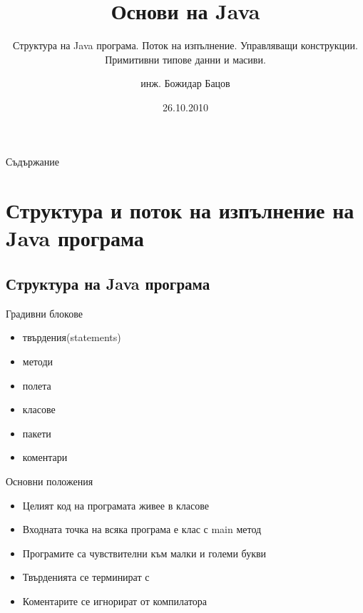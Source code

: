 \documentclass{beamer}
\title{Основи на Java}
\subtitle
{Структура на Java програма. Поток на изпълнение. Управляващи
  конструкции. Примитивни типове данни и масиви.}
\author{инж. Божидар Бацов}
\institute{Drow Ltd.}
\date{26.10.2010}
\begin{document}

\begin{frame}
  \titlepage
\end{frame}

\begin{frame}{Съдържание}
  \tableofcontents
\end{frame}




\section{Структура и поток на изпълнение на Java програма}

\subsection{Структура на Java програма}

\begin{frame}{Градивни блокове}
  \transdissolve
  \begin{itemize}
  \item твърдения(statements)
  \item методи
  \item полета
  \item класове
  \item пакети
  \item коментари
  \end{itemize}
\end{frame}


\begin{frame}{Основни положения}  
  \transdissolve
  \begin{itemize}
    \item Целият код на програмата живее в класове
    \item Входната точка на всяка програма е клас с main метод
    \item Програмите са чувствителни към малки и големи букви
    \item Твърденията се терминират с
    \item Коментарите се игнорират от компилатора
  \end{itemize}
\end{frame}
\end{document}
